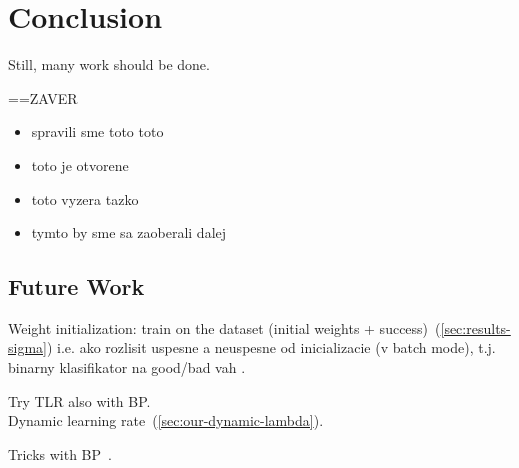 \section*{Conclusion}
\label{sec:conclusion} 

Still, many work should be done. 


==ZAVER 
\begin{itemize} 
\item   spravili sme toto toto
\item   toto je otvorene
\item   toto vyzera tazko
\item   tymto by sme sa zaoberali dalej 
\end{itemize} 


\subsection*{Future Work} 
Weight initialization: train on the dataset (initial weights + success)~(\ref{sec:results-sigma}) 
i.e. ako rozlisit uspesne a neuspesne od inicializacie (v batch mode), t.j. binarny klasifikator na good/bad vah . 

Try TLR also with BP.  \\ 

\label{sec:future-dlr} 
Dynamic learning rate~(\ref{sec:our-dynamic-lambda}). 

Tricks with BP~\citep{lecun2012efficient}. 



